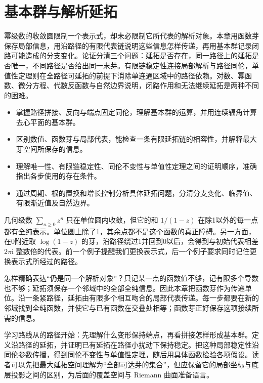 \chapter{基本群与解析延拓}
\label{b3:ch:09}
\begin{chapterabstract}
幂级数的收敛圆限制一个表示式，却未必限制它所代表的解析对象。本章用函数芽保存局部信息，用沿路径的有限代表链说明这些信息怎样传递，再用基本群记录闭路可能造成的分支变化。论证分清三个问题：延拓是否存在，同一路径上的延拓是否唯一，不同路径是否给出同一末芽。有限链稳定性连接局部解析与路径同伦，单值性定理则在全路径可延拓的前提下消除单连通区域中的路径依赖。对数、幂函数、微分方程、代数反函数与自然边界说明，闭路作用和无法继续延拓是两种不同的困难。
\end{chapterabstract}

\begin{learninggoals}
\begin{itemize}
\item\label{b3:item:09-goal-1}掌握路径拼接、反向与端点固定同伦，理解基本群的运算，并用连续辐角计算去心平面的基本群。
\item\label{b3:item:09-goal-2}区别数值、函数芽与局部代表，能检查一条有限延拓链的相容性，并解释最大芽空间所保存的信息。
\item\label{b3:item:09-goal-3}理解唯一性、有限链稳定性、同伦不变性与单值性定理之间的证明顺序，准确指出各步使用的存在条件。
\item\label{b3:item:09-goal-4}通过周期、根的置换和增长控制分析具体延拓问题，分清分支变化、临界值、有限渐近值及自然边界。
\end{itemize}
\end{learninggoals}

几何级数 \(\sum_{n\ge0}z^n\) 只在单位圆内收敛，但它的和 \(1/(1-z)\) 在除1以外的每一点都有全纯表示。单位圆上除了1，其余点都不是这个函数的真正障碍。另一方面，在0附近取 \(\log(1-z)\) 的芽，沿路径绕过1并回到0以后，会得到与初始代表相差 \(2\pi\mathrm i\) 整数倍的代表。前一个例子提醒我们更换表示式，后一个例子要求同时记住更换表示式所经过的路径。

\ProseParagraphBreak
怎样精确表达“仍是同一个解析对象”？只记某一点的函数值不够，记有限多个导数也不够；延拓须保存一个邻域中的全部全纯信息。因此本章把函数芽作为传递单位。沿一条紧路径，延拓由有限多个相互吻合的局部代表传递。每一步都要在新的邻域找到全纯函数，并使它与已有函数在交叠处相等；函数芽正好保存这项接续所需的信息。

\ProseParagraphBreak
学习路线从的路径开始：先理解什么变形保持端点，再看拼接怎样形成基本群。定义沿路径的延拓，并证明已有延拓在路径小扰动下保持稳定。把这种局部稳定性沿同伦参数传播，得到同伦不变性与单值性定理，随后用具体函数检验各项假设。读者可以先把最大延拓空间理解为“全部可达芽的集合”，但应保留它的局部坐标与底层投影之间的区别，为后面的覆盖空间与 Riemann 曲面准备语言。


